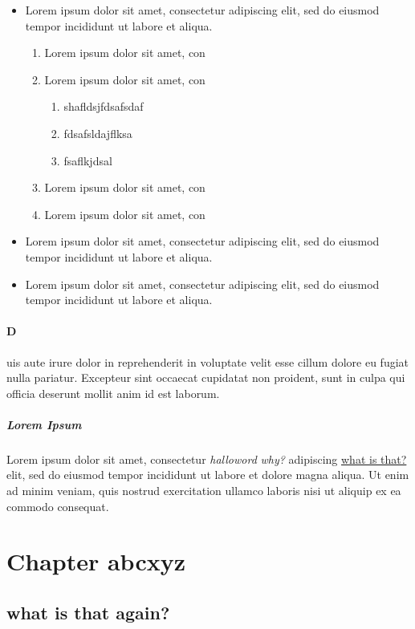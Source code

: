\documentclass[a4paper,12pt]{article}
\begin{document}
\begin{itemize}
\item Lorem ipsum dolor sit amet, consectetur adipiscing elit, sed do eiusmod tempor incididunt ut labore et aliqua.
\begin{enumerate}
\item Lorem ipsum dolor sit amet, con
\item Lorem ipsum dolor sit amet, con
\begin{enumerate}
\item shafldsjfdsafsdaf
\item fdsafsldajflksa
\item fsaflkjdsal
\end{enumerate}
\item Lorem ipsum dolor sit amet, con
\item Lorem ipsum dolor sit amet, con
\end{enumerate}
\item Lorem ipsum dolor sit amet, consectetur adipiscing elit, sed do eiusmod tempor incididunt ut labore et aliqua.
\item Lorem ipsum dolor sit amet, consectetur adipiscing elit, sed do eiusmod tempor incididunt ut labore et aliqua.
\end{itemize}
\paragraph {\huge D}uis aute irure dolor in reprehenderit in voluptate velit esse cillum dolore eu fugiat nulla pariatur. Excepteur sint occaecat cupidatat non proident, sunt in culpa qui officia deserunt mollit anim id est laborum.
\subparagraph*{Lorem Ipsum}
Lorem ipsum dolor sit amet, consectetur \textit{halloword} \textsl{why?}  adipiscing \underline{what is that?} elit, sed do eiusmod tempor incididunt ut labore et dolore magna aliqua. Ut enim ad minim veniam, quis nostrud exercitation ullamco laboris nisi ut aliquip ex ea commodo consequat.
\section{Chapter abcxyz}
\subsection{what is that again?}
\end{document}

